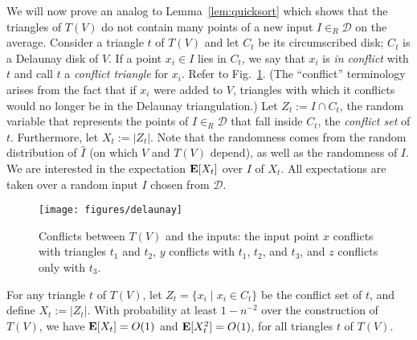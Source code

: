 \documentclass{siamltex}
\newcommand{\D}{\mathcal{D}}
\newcommand{\EX}{\hbox{\bf E}}
\newcommand{\eqdef}{:=}
\begin{document}
We will now prove an analog to
Lemma~\ref{lem:quicksort} which shows that the
triangles of $T(V)$ do not contain many points
of a new input $I \in_R \D$ on the average. Consider
a triangle $t$ of $T(V)$ and let $C_t$ be its
circumscribed disk; $C_t$ is a Delaunay disk of $V$. If a point
$x_i \in I$ lies in $C_t$, we say that $x_i$ is \emph{in conflict}
with $t$ and call $t$ a \emph{conflict triangle} for $x_i$.
Refer to Fig.~\ref{fig:conf}.
(The ``conflict'' terminology arises from the fact that if
$x_i$ were added to $V$, triangles with which it conflicts
would no longer be in the Delaunay triangulation.) 
Let
$Z_t \eqdef I \cap C_t$, the random variable that represents
the points of $I \in_R \D$ that fall inside $C_t$, the
\emph{conflict set} of $t$. Furthermore, let
$X_t \eqdef |Z_t|$.
Note that the randomness comes from the random distribution
of $\hat I$ (on which $V$ and $T(V)$ depend), as well as the randomness of $I$.
We are interested in the expectation $\EX[X_t]$ over $I$ of $X_t$.
All expectations are taken over a random input $I$ chosen
from $\D$.
\begin{figure}
\begin{center}
\texttt{[image: figures/delaunay]}
\end{center}
\caption{Conflicts between $T(V)$ and the inputs: the input point $x$ conflicts with
triangles $t_1$ and $t_2$, $y$ conflicts with $t_1$, $t_2$, and $t_3$,
and $z$ conflicts only with $t_3$. } \label{fig:conf}
\end{figure}

\begin{lemma} \label{lem:learning} 
For any triangle $t$ of $T(V)$,
let $Z_t = \{x_i \mid x_i \in C_t \}$ be the conflict set of $t$, 
and define $X_t \eqdef |Z_t|$.
With probability at least $1 - n^{-2}$ over
the construction of $T(V)$,
we have
$\EX[X_t] = O(1)$ and $\EX[X_t^2] = O(1)$, for all triangles $t$ of $T(V)$.
\end{lemma}
\end{document}
